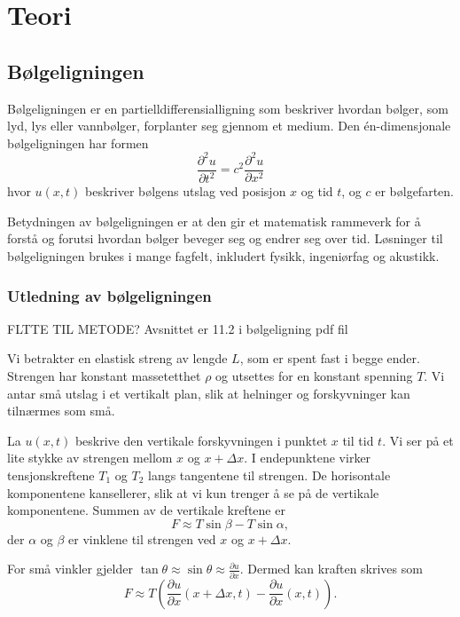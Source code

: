 \section{Teori}
\subsection{Bølgeligningen}

    Bølgeligningen er en partielldifferensialligning som beskriver hvordan bølger, som lyd, lys eller vannbølger, forplanter seg gjennom et medium. Den én-dimensjonale bølgeligningen har formen
    \[
    \frac{\partial^2 u}{\partial t^2} = c^2 \frac{\partial^2 u}{\partial x^2}
    \]
    hvor $u(x,t)$ beskriver bølgens utslag ved posisjon $x$ og tid $t$, og $c$ er bølgefarten.

    Betydningen av bølgeligningen er at den gir et matematisk rammeverk for å forstå og forutsi hvordan bølger beveger seg og endrer seg over tid. Løsninger til bølgeligningen brukes i mange fagfelt, inkludert fysikk, ingeniørfag og akustikk.
 
    \subsubsection{Utledning av bølgeligningen}

        FLTTE TIL METODE?  Avsnittet er 11.2 i bølgeligning pdf fil

        Vi betrakter en elastisk streng av lengde $L$, som er spent fast i begge ender. Strengen
        har konstant massetetthet $\rho$ og utsettes for en konstant spenning $T$. 
        Vi antar små utslag i et vertikalt plan, slik at helninger og forskyvninger
        kan tilnærmes som små. 

        La $u(x,t)$ beskrive den vertikale forskyvningen i punktet $x$ til tid $t$.
        Vi ser på et lite stykke av strengen mellom $x$ og $x+\Delta x$. I endepunktene virker
        tensjonskreftene $T_1$ og $T_2$ langs tangentene til strengen. De horisontale
        komponentene kansellerer, slik at vi kun trenger å se på de vertikale komponentene.
        Summen av de vertikale kreftene er
        \[
        F \approx T \sin\beta - T \sin\alpha,
        \]
        der $\alpha$ og $\beta$ er vinklene til strengen ved $x$ og $x+\Delta x$.

        For små vinkler gjelder $\tan\theta \approx \sin\theta \approx \tfrac{\partial u}{\partial x}$.
        Dermed kan kraften skrives som
        \[
        F \approx T\left( \frac{\partial u}{\partial x}(x+\Delta x,t) -
                        \frac{\partial u}{\partial x}(x,t)\right).
        \]

